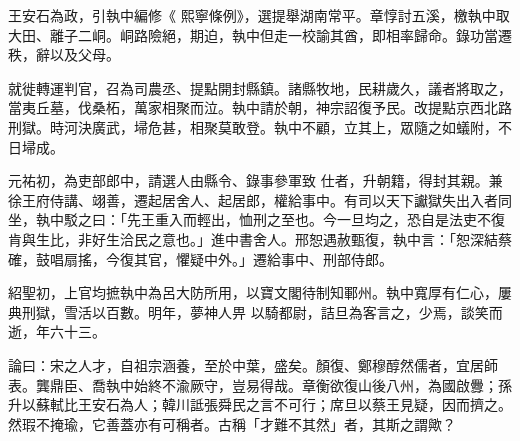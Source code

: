 \begin{pinyinscope}
 王安石為政，引執中編修《
 熙寧條例》，選提舉湖南常平。章惇討五溪，檄執中取大田、離子二峒。峒路險絕，期迫，執中但走一校諭其酋，即相率歸命。錄功當遷秩，辭以及父母。



 就徙轉運判官，召為司農丞、提點開封縣鎮。諸縣牧地，民耕歲久，議者將取之，當夷丘墓，伐桑柘，萬家相聚而泣。執中請於朝，神宗詔復予民。改提點京西北路刑獄。時河決廣武，埽危甚，相聚莫敢登。執中不顧，立其上，眾隨之如蟻附，不日埽成。



 元祐初，為吏部郎中，請選人由縣令、錄事參軍致
 仕者，升朝籍，得封其親。兼徐王府侍講、翊善，遷起居舍人、起居郎，權給事中。有司以天下讞獄失出入者同坐，執中駁之曰：「先王重入而輕出，恤刑之至也。今一旦均之，恐自是法吏不復肯與生比，非好生洽民之意也。」進中書舍人。邢恕遇赦甄復，執中言：「恕深結蔡確，鼓唱扇搖，今復其官，懼疑中外。」遷給事中、刑部侍郎。



 紹聖初，上官均摭執中為呂大防所用，以寶文閣待制知鄆州。執中寬厚有仁心，屢典刑獄，雪活以百數。明年，夢神人畀
 以騎都尉，詰旦為客言之，少焉，談笑而逝，年六十三。



 論曰：宋之人才，自祖宗涵養，至於中葉，盛矣。顏復、鄭穆醇然儒者，宜居師表。龔鼎臣、喬執中始終不渝厥守，豈易得哉。章衡欲復山後八州，為國啟釁；孫升以蘇軾比王安石為人；韓川詆張舜民之言不可行；席旦以蔡王見疑，因而擠之。然瑕不掩瑜，它善蓋亦有可稱者。古稱「才難不其然」者，其斯之謂歟？



\end{pinyinscope}